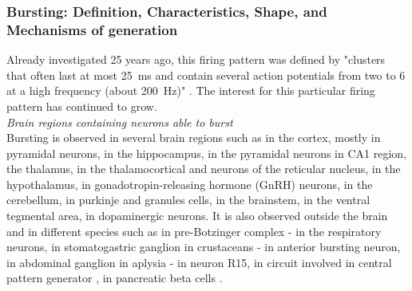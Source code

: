 \subsubsection{Bursting: Definition, Characteristics, Shape, and Mechanisms of generation}
Already investigated 25 years ago, this firing pattern was defined by "clusters that often last at most \SI{25}{ms} and contain several action potentials from two to 6 at a high frequency (about \SI{200}{Hz})" \citep{lisman_bursts_1997}. The interest for this particular firing pattern has continued to grow. 
~\\
\textit{Brain regions containing neurons able to burst}\\
Bursting is observed in several brain regions  \citep{shao_neural_2021, zeldenrust_neural_2018} such as in the cortex, mostly in pyramidal neurons, in the hippocampus, in the pyramidal neurons in CA1 region, the thalamus, in the thalamocortical and neurons of the reticular nucleus, in the hypothalamus, in gonadotropin-releasing hormone (GnRH)  neurons, in the cerebellum, in purkinje and granules cells,  in the brainstem, in the ventral tegmental area, in dopaminergic neurons. It is also observed outside the brain and in different species such as in pre-Botzinger complex - in the respiratory neurons, in stomatogastric ganglion in crustaceans - in anterior bursting neuron, in abdominal ganglion in aplysia - in neuron R15,  in circuit involved in central pattern generator \citep{grillner_CPGs_2021}, in pancreatic beta cells \citep{jeong_bursting_2012}. 

